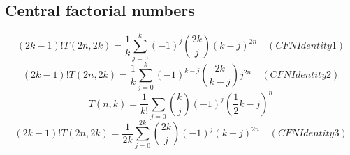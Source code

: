 \subsection{Central factorial numbers}\label{subsec:central-factorial-numbers}

\begin{equation*}
(2k-1)!T(2n,2k) = \frac{1}{k} \sum_{j=0}^{k} (-1)^j \binom{2k}{j} (k-j)^{2n} \quad
(CFNIdentity1)
\end{equation*}
\begin{equation*}
(2k-1)!T(2n,2k) = \frac{1}{k} \sum_{j=0}^{k} (-1)^{k-j} \binom{2k}{k-j} j^{2n} \quad
(CFNIdentity2)
\end{equation*}
\begin{equation*}
    T(n,k) = \frac{1}{k!} \sum_{j=0} \binom{k}{j} (-1)^{j} \left( \frac{1}{2}k - j \right)^{n}
\end{equation*}
\begin{equation*}
(2k-1)!T(2n, 2k) = \frac{1}{2k} \sum_{j=0}^{2k} \binom{2k}{j} (-1)^{j} (k-j)^{2n} \quad
(CFNIdentity3)
\end{equation*}

